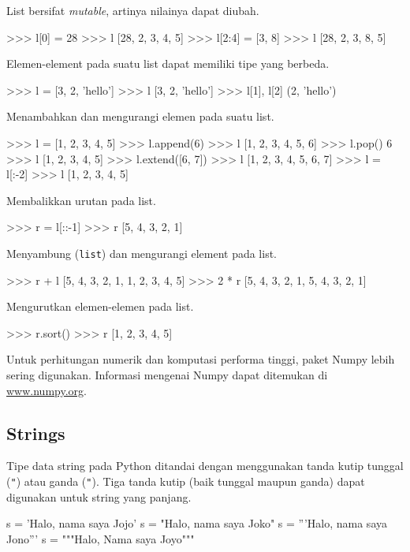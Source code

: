 List bersifat \textit{mutable}, artinya nilainya dapat diubah.
\begin{pyconcode}
>>> l[0] = 28
>>> l
[28, 2, 3, 4, 5]
>>> l[2:4] = [3, 8] 
>>> l
[28, 2, 3, 8, 5]
\end{pyconcode}

Elemen-element pada suatu list dapat memiliki tipe yang berbeda.
\begin{pyconcode}
>>> l = [3, 2, 'hello']
>>> l
[3, 2, 'hello']
>>> l[1], l[2]
(2, 'hello')
\end{pyconcode}

Menambahkan dan mengurangi elemen pada suatu list.
\begin{pyconcode}
>>> l = [1, 2, 3, 4, 5]
>>> l.append(6)
>>> l
[1, 2, 3, 4, 5, 6]
>>> l.pop()
6
>>> l
[1, 2, 3, 4, 5]
>>> l.extend([6, 7])
>>> l
[1, 2, 3, 4, 5, 6, 7]
>>> l = l[:-2]
>>> l
[1, 2, 3, 4, 5]
\end{pyconcode}

Membalikkan urutan pada list.
\begin{pyconcode}
>>> r = l[::-1]
>>> r
[5, 4, 3, 2, 1]
\end{pyconcode}

Menyambung (\texttt{list}) dan mengurangi element pada list.
\begin{pyconcode}
>>> r + l
[5, 4, 3, 2, 1, 1, 2, 3, 4, 5]
>>> 2 * r
[5, 4, 3, 2, 1, 5, 4, 3, 2, 1]
\end{pyconcode}

Mengurutkan elemen-elemen pada list.
\begin{pyconcode}
>>> r.sort()
>>> r
[1, 2, 3, 4, 5]
\end{pyconcode}


Untuk perhitungan numerik dan komputasi performa tinggi, paket
\textsf{Numpy} lebih sering digunakan. Informasi mengenai \textsf{Numpy}
dapat ditemukan di \url{www.numpy.org}.


\subsection{Strings}

Tipe data string pada Python ditandai dengan menggunakan tanda
kutip tunggal (\texttt{"}) atau ganda (\texttt{"}). Tiga tanda kutip
(baik tunggal maupun ganda) dapat digunakan untuk string yang panjang.
\begin{pythoncode}
s = 'Halo, nama saya Jojo'
s = "Halo, nama saya Joko"
s = '''Halo, 
       nama saya Jono'''
s = """Halo,
   Nama saya Joyo"""
\end{pythoncode}

